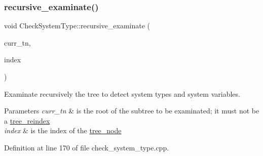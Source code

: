 \subsubsection{\texorpdfstring{recursive\+\_\+examinate()}{recursive\_examinate()}\hspace{0.1cm}{\footnotesize\ttfamily [2/2]}}
{\footnotesize\ttfamily void Check\+System\+Type\+::recursive\+\_\+examinate (\begin{DoxyParamCaption}\item[{const \hyperlink{tree__node_8hpp_a6ee377554d1c4871ad66a337eaa67fd5}{tree\+\_\+node\+Ref} \&}]{curr\+\_\+tn,  }\item[{const unsigned int}]{index }\end{DoxyParamCaption})\hspace{0.3cm}{\ttfamily [private]}}



Examinate recursively the tree to detect system types and system variables. 


\begin{DoxyParams}{Parameters}
{\em curr\+\_\+tn} & is the root of the subtree to be examinated; it must not be a \hyperlink{classtree__reindex}{tree\+\_\+reindex} \\
\hline
{\em index} & is the index of the \hyperlink{classtree__node}{tree\+\_\+node} \\
\hline
\end{DoxyParams}


Definition at line 170 of file check\+\_\+system\+\_\+type.\+cpp.



